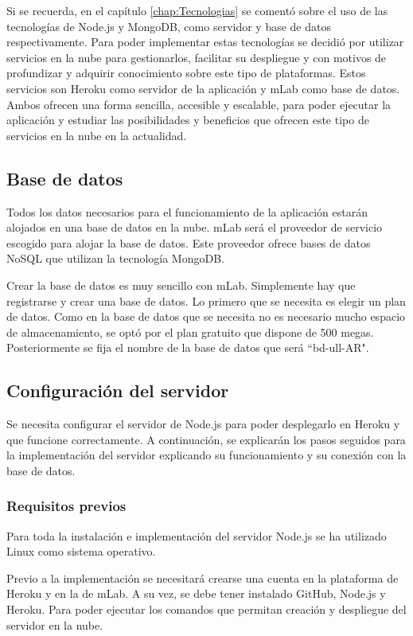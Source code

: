 Si se recuerda, en el capítulo \ref{chap:Tecnologias} se comentó sobre el uso de las tecnologías de Node.js y MongoDB, como servidor y base de datos respectivamente. Para poder implementar estas tecnologías se decidió por utilizar servicios en la nube para gestionarlos, facilitar su despliegue y con motivos de profundizar y adquirir conocimiento sobre este tipo de plataformas. Estos servicios son Heroku como servidor de la aplicación y mLab como base de datos. Ambos ofrecen una forma sencilla, accesible y escalable, para poder ejecutar la aplicación y estudiar las posibilidades y beneficios que ofrecen este tipo de servicios en la nube en la actualidad.

\subsection{Base de datos}

Todos los datos necesarios para el funcionamiento de la aplicación estarán alojados en una base de datos en la nube. mLab será el proveedor de servicio escogido para alojar la base de datos. Este proveedor ofrece bases de datos NoSQL que utilizan la tecnología MongoDB.

Crear la base de datos es muy sencillo con mLab. Simplemente hay que registrarse y crear una base de datos. Lo primero que se necesita es elegir un plan de datos. Como en la base de datos que se necesita no es necesario mucho espacio de almacenamiento, se optó por el plan gratuito que dispone de 500 megas. Posteriormente se fija el nombre de la base de datos que será ``bd-ull-AR".

\subsection{Configuración del servidor}

Se necesita configurar el servidor de Node.js para poder desplegarlo en Heroku y que funcione correctamente. A continuación, se explicarán los pasos seguidos para la implementación del servidor explicando su funcionamiento y su conexión con la base de datos.

\subsubsection{Requisitos previos}
Para toda la instalación e implementación del servidor Node.js se ha utilizado Linux como sistema operativo.

Previo a la implementación se necesitará crearse una cuenta en la plataforma de Heroku y en la de mLab. A su vez, se debe tener instalado GitHub, Node.js y Heroku. Para poder ejecutar los comandos que permitan creación y despliegue del servidor en la nube.

